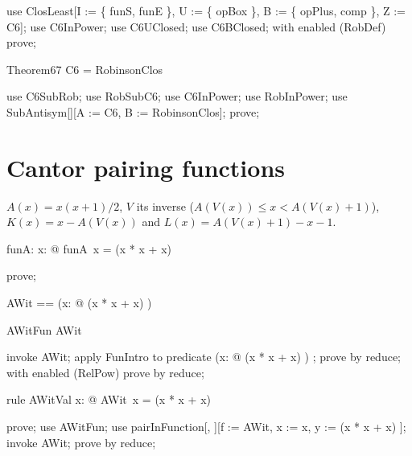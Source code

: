 \documentclass{article}
\begin{document}
\begin{zproof}
use ClosLeast[I := \{ funS, funE \}, U := \{ opBox \}, B := \{ opPlus, comp \}, Z := C6];
use C6InPower;
use C6UClosed;
use C6BClosed;
with enabled (RobDef) prove;
\end{zproof}

\begin{theorem}{Theorem67}
  C6 = RobinsonClos
\end{theorem}

\begin{zproof}
use C6SubRob;
use RobSubC6;
use C6InPower;
use RobInPower;
use SubAntisym[\nat \fun \nat][A := C6, B := RobinsonClos];
prove;
\end{zproof}

\section{Cantor pairing functions}

$A(x) = x(x+1)/2$, $V$ its inverse ($A(V(x)) \le x < A(V(x)+1)$),
$K(x) = x - A(V(x))$ and $L(x) = A(V(x)+1) - x - 1$.

\begin{axdef}
  funA: \nat \fun \nat
\where
   \forall x: \nat @ funA~x = (x * x + x) 
\end{axdef}

\begin{zproof}
prove;
\end{zproof}

\begin{zed}
  AWit == (\lambda x: \nat @ (x * x + x) )
\end{zed}

\begin{theorem}{AWitFun}
  AWit \in \nat \fun \nat
\end{theorem}

\begin{zproof}
invoke AWit;
apply FunIntro to predicate (\lambda x: \nat @ (x * x + x) ) \in \nat \fun \nat;
prove by reduce;
with enabled (RelPow) prove by reduce;
\end{zproof}

\begin{theorem}{rule AWitVal}
  \forall x: \nat @ AWit~x = (x * x + x) 
\end{theorem}

\begin{zproof}
prove;
use AWitFun;
use pairInFunction[\nat, \nat][f := AWit, x := x, y := (x * x + x) ];
invoke AWit;
prove by reduce;
\end{zproof}
\end{document}
